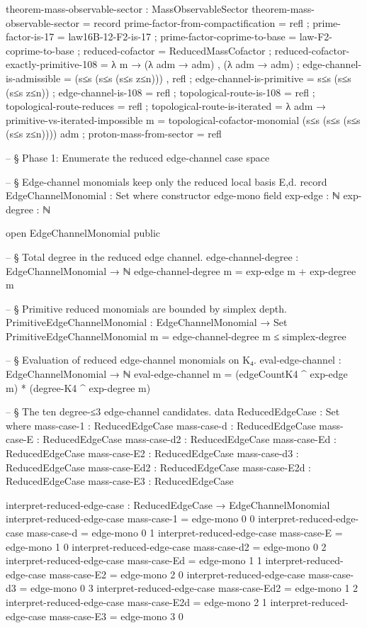 \documentclass[11pt,a4paper]{book}
\begin{document}
\begin{code}
theorem-mass-observable-sector : MassObservableSector
theorem-mass-observable-sector = record
  { prime-factor-from-compactification = refl
  ; prime-factor-is-17 = law16B-12-F2-is-17
  ; prime-factor-coprime-to-base = law-F2-coprime-to-base
  ; reduced-cofactor = ReducedMassCofactor
  ; reduced-cofactor-exactly-primitive-108 =
      λ m → (λ adm → adm) , (λ adm → adm)
  ; edge-channel-is-admissible = (s≤s (s≤s (s≤s z≤n))) , refl
  ; edge-channel-is-primitive = s≤s (s≤s (s≤s z≤n))
  ; edge-channel-is-108 = refl
  ; topological-route-is-108 = refl
  ; topological-route-reduces = refl
  ; topological-route-is-iterated =
      λ adm →
        primitive-vs-iterated-impossible {m = topological-cofactor-monomial}
          (s≤s (s≤s (s≤s (s≤s z≤n))))
          adm
  ; proton-mass-from-sector = refl
  }



-- § Phase 1: Enumerate the reduced edge-channel case space

-- § Edge-channel monomials keep only the reduced local basis {E,d}.
record EdgeChannelMonomial : Set where
  constructor edge-mono
  field
    exp-edge : ℕ
    exp-degree : ℕ

open EdgeChannelMonomial public

-- § Total degree in the reduced edge channel.
edge-channel-degree : EdgeChannelMonomial → ℕ
edge-channel-degree m = exp-edge m + exp-degree m

-- § Primitive reduced monomials are bounded by simplex depth.
PrimitiveEdgeChannelMonomial : EdgeChannelMonomial → Set
PrimitiveEdgeChannelMonomial m = edge-channel-degree m ≤ simplex-degree

-- § Evaluation of reduced edge-channel monomials on K₄.
eval-edge-channel : EdgeChannelMonomial → ℕ
eval-edge-channel m =
  (edgeCountK4 ^ exp-edge m) * (degree-K4 ^ exp-degree m)

-- § The ten degree-≤3 edge-channel candidates.
data ReducedEdgeCase : Set where
  mass-case-1   : ReducedEdgeCase
  mass-case-d   : ReducedEdgeCase
  mass-case-E   : ReducedEdgeCase
  mass-case-d2  : ReducedEdgeCase
  mass-case-Ed  : ReducedEdgeCase
  mass-case-E2  : ReducedEdgeCase
  mass-case-d3  : ReducedEdgeCase
  mass-case-Ed2 : ReducedEdgeCase
  mass-case-E2d : ReducedEdgeCase
  mass-case-E3  : ReducedEdgeCase

interpret-reduced-edge-case : ReducedEdgeCase → EdgeChannelMonomial
interpret-reduced-edge-case mass-case-1   = edge-mono 0 0
interpret-reduced-edge-case mass-case-d   = edge-mono 0 1
interpret-reduced-edge-case mass-case-E   = edge-mono 1 0
interpret-reduced-edge-case mass-case-d2  = edge-mono 0 2
interpret-reduced-edge-case mass-case-Ed  = edge-mono 1 1
interpret-reduced-edge-case mass-case-E2  = edge-mono 2 0
interpret-reduced-edge-case mass-case-d3  = edge-mono 0 3
interpret-reduced-edge-case mass-case-Ed2 = edge-mono 1 2
interpret-reduced-edge-case mass-case-E2d = edge-mono 2 1
interpret-reduced-edge-case mass-case-E3  = edge-mono 3 0


\end{code}
\end{document}
